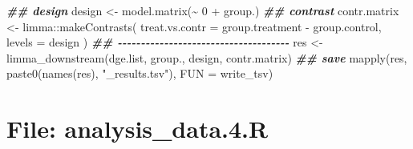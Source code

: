 \documentclass[
]{article}
\newenvironment{Shaded}{\begin{snugshade}}{\end{snugshade}}
\newcommand{\AttributeTok}[1]{\textcolor[rgb]{0.77,0.63,0.00}{#1}}
\newcommand{\DecValTok}[1]{\textcolor[rgb]{0.00,0.00,0.81}{#1}}
\newcommand{\DocumentationTok}[1]{\textcolor[rgb]{0.56,0.35,0.01}{\textbf{\textit{#1}}}}
\newcommand{\FunctionTok}[1]{\textcolor[rgb]{0.00,0.00,0.00}{#1}}
\newcommand{\NormalTok}[1]{#1}
\newcommand{\OtherTok}[1]{\textcolor[rgb]{0.56,0.35,0.01}{#1}}
\newcommand{\SpecialCharTok}[1]{\textcolor[rgb]{0.00,0.00,0.00}{#1}}
\newcommand{\StringTok}[1]{\textcolor[rgb]{0.31,0.60,0.02}{#1}}
\begin{document}
\begin{Shaded}
\begin{Highlighting}[]
\DocumentationTok{\#\# design}
\NormalTok{design }\OtherTok{\textless{}{-}} \FunctionTok{model.matrix}\NormalTok{(}\SpecialCharTok{\textasciitilde{}} \DecValTok{0} \SpecialCharTok{+}\NormalTok{ group.)}
\DocumentationTok{\#\# contrast}
\NormalTok{contr.matrix }\OtherTok{\textless{}{-}}\NormalTok{ limma}\SpecialCharTok{::}\FunctionTok{makeContrasts}\NormalTok{(}
  \AttributeTok{treat.vs.contr =}\NormalTok{ group.treatment }\SpecialCharTok{{-}}\NormalTok{ group.control,}
  \AttributeTok{levels =}\NormalTok{ design}
\NormalTok{)}
\DocumentationTok{\#\# {-}{-}{-}{-}{-}{-}{-}{-}{-}{-}{-}{-}{-}{-}{-}{-}{-}{-}{-}{-}{-}{-}{-}{-}{-}{-}{-}{-}{-}{-}{-}{-}{-}{-}{-}{-}{-} }
\NormalTok{res }\OtherTok{\textless{}{-}} \FunctionTok{limma\_downstream}\NormalTok{(dge.list, group., design, contr.matrix)}
\DocumentationTok{\#\# save}
\FunctionTok{mapply}\NormalTok{(res, }\FunctionTok{paste0}\NormalTok{(}\FunctionTok{names}\NormalTok{(res), }\StringTok{"\_results.tsv"}\NormalTok{), }\AttributeTok{FUN =}\NormalTok{ write\_tsv)}
\end{Highlighting}
\end{Shaded}

\hypertarget{file-analysis_data.4.r}{%
\section{File: analysis\_data.4.R}\label{file-analysis_data.4.r}}
\end{document}

